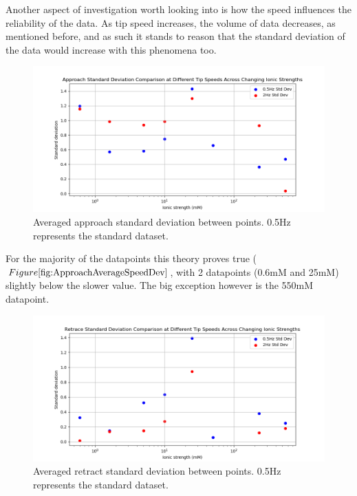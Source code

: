 Another aspect of investigation worth looking into is how the speed influences the reliability of the data. As tip speed increases, the volume of data decreases, as mentioned before, and as such it stands to reason that the standard deviation of the data would increase with this phenomena too.

\begin{figure}[h!]
\centering
\includegraphics[width=\textwidth]{chapter7/Tip speed/Standard deviation change.png}
\caption{Averaged approach standard deviation between points. 0.5Hz represents the standard dataset.}
\label{fig:ApproachAverageSpeedDev}
\end{figure}

For the majority of the datapoints this theory proves true ($Figure \ref{fig:ApproachAverageSpeedDev}$, with 2 datapoints (0.6mM and 25mM) slightly below the slower value. The big exception however is the 550mM datapoint.

\begin{figure}[h!!!]
\centering
\includegraphics[width=\textwidth]{chapter7/Tip speed/Standard deviation change retract.png}
\caption{Averaged retract standard deviation between points. 0.5Hz represents the standard dataset.}
\label{fig:RetractAverageSpeedDev}
\end{figure}

